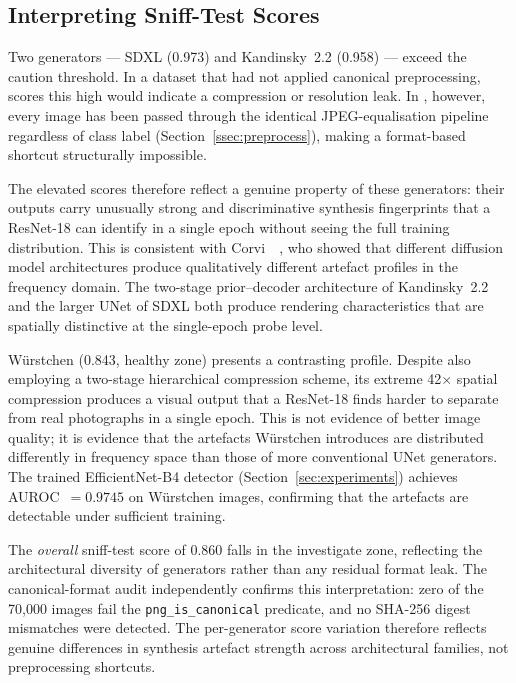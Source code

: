 \subsection{Interpreting Sniff-Test Scores}
\label{ssec:sniff_interpret}

Two generators --- SDXL (0.973) and Kandinsky~2.2 (0.958) --- exceed
the caution threshold.
In a dataset that had not applied canonical preprocessing, scores
this high would indicate a compression or resolution leak.
In \textbf{\datasetname}, however, every image has been passed through
the identical JPEG-equalisation pipeline regardless of class label
(Section~\ref{ssec:preprocess}), making a format-based shortcut
structurally impossible.

The elevated scores therefore reflect a genuine property of these
generators: their outputs carry unusually strong and discriminative
synthesis fingerprints that a ResNet-18 can identify in a single
epoch without seeing the full training distribution.
This is consistent with Corvi~\etal~\cite{corvi2023detection},
who showed that different diffusion model architectures produce
qualitatively different artefact profiles in the frequency domain.
The two-stage prior--decoder architecture of Kandinsky~2.2 and the
larger UNet of SDXL both produce rendering characteristics that are
spatially distinctive at the single-epoch probe level.

W\"{u}rstchen (0.843, healthy zone) presents a contrasting profile.
Despite also employing a two-stage hierarchical compression scheme,
its extreme 42$\times$ spatial compression produces a visual output
that a ResNet-18 finds harder to separate from real photographs in a
single epoch.
This is not evidence of better image quality; it is evidence that the
artefacts Würstchen introduces are distributed differently in
frequency space than those of more conventional UNet generators.
The trained EfficientNet-B4 detector (Section~\ref{sec:experiments})
achieves AUROC~$= 0.9745$ on Würstchen images, confirming that the
artefacts are detectable under sufficient training.

The \emph{overall} sniff-test score of 0.860 falls in the investigate
zone, reflecting the architectural diversity of generators rather than
any residual format leak.
The canonical-format audit independently confirms this interpretation:
zero of the 70,000 images fail the \texttt{png\_is\_canonical}
predicate, and no SHA-256 digest mismatches were detected.
The per-generator score variation therefore reflects genuine differences
in synthesis artefact strength across architectural families, not
preprocessing shortcuts.

